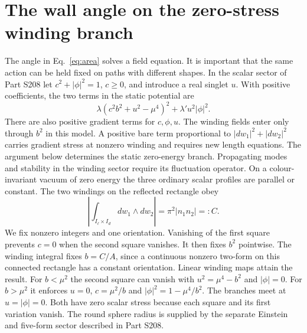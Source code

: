 \documentclass[aps,prd,reprint,onecolumn,nofootinbib,amsmath,amssymb]{revtex4-2}
\begin{document}
\section{The wall angle on the zero-stress winding branch}
The angle in Eq.~\eqref{eq:area} solves a field equation. It is important that the same action can be held fixed on paths with different shapes. In the scalar sector of Part S208 let $c^2+|\phi|^2=1$, $c\geq0$, and introduce a real singlet $u$. With positive coefficients, the two terms in the static potential are
\begin{equation}
 \lambda(c^2 b^2+u^2-\mu^4)^2+
 \lambda' u^2|\phi|^2 .
 \label{eq:potential}
\end{equation}
There are also positive gradient terms for $c,\phi,u$. The winding fields enter only through $b^2$ in this model. A positive bare term proportional to $|dw_1|^2+|dw_2|^2$ carries gradient stress at nonzero winding and requires new length equations. The argument below determines the static zero-energy branch. Propagating modes and stability in the winding sector require its fluctuation operator. On a colour-invariant vacuum of zero energy the three ordinary scalar profiles are parallel or constant. The two windings on the reflected rectangle obey
\begin{equation}
 \left|\int_{I_\ell\times I_d} dw_1\wedge dw_2\right|
 =\pi^2|n_1n_2|=:C .
\end{equation}
We fix nonzero integers and one orientation. Vanishing of the first square prevents $c=0$ when the second square vanishes. It then fixes $b^2$ pointwise. The winding integral fixes $b=C/A$, since a continuous nonzero two-form on this connected rectangle has a constant orientation. Linear winding maps attain the result. For $b<\mu^2$ the second square can vanish with $u^2=\mu^4-b^2$ and $|\phi|=0$. For $b>\mu^2$ it enforces $u=0$, $c=\mu^2/b$ and $|\phi|^2=1-\mu^4/b^2$. The branches meet at $u=|\phi|=0$. Both have zero scalar stress because each square and its first variation vanish. The round sphere radius is supplied by the separate Einstein and five-form sector described in Part S208.
\end{document}
